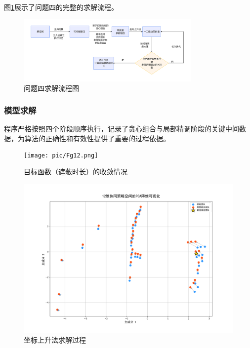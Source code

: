 \documentclass[12pt]{article}
\begin{document}
\begin{CJK}{UTF8}{gbsn}
		图\ref{fig:flowchart_q4}展示了问题四的完整的求解流程。
		
		\begin{figure}[H]
			\centering
			\includegraphics[width=0.8\textwidth]{pic/Fg8-Pb4.jpg}
			\caption{问题四求解流程图}
			\label{fig:flowchart_q4}
		\end{figure}
		
		
		\subsubsection{模型求解}
		程序严格按照四个阶段顺序执行，记录了贪心组合与局部精调阶段的关键中间数据，为算法的正确性和有效性提供了重要的过程依据。
		
		\begin{figure}[H]
			\centering
			\begin{minipage}[b]{0.48\textwidth}
				\centering
				\texttt{[image: pic/Fg12.png]}
				\caption{目标函数（遮蔽时长）的收敛情况}
				\label{fig:pca_q4_left}
			\end{minipage}
			\hfill
			\begin{minipage}[b]{0.48\textwidth}
				\centering					\includegraphics[width=\textwidth, height=0.25\textheight]{pic/Fg13.png}
				\caption{坐标上升法求解过程}
				\label{fig:pca_q4_right}
			\end{minipage}
		\end{figure}
		

\end{CJK}
\end{document}
